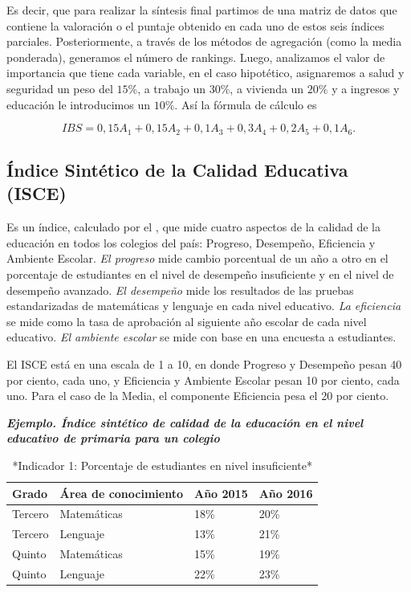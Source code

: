 \documentclass[
]{book}
\begin{document}
Es decir, que para realizar la síntesis final partimos de una matriz de datos que contiene la valoración o el puntaje obtenido en cada uno de estos seis índices parciales. Posteriormente, a través de los métodos de agregación (como la media ponderada), generamos el número de rankings. Luego, analizamos el valor de importancia que tiene cada variable, en el caso hipotético, asignaremos a salud y seguridad un peso del \(15\%\), a trabajo un \(30\%\), a vivienda un \(20\%\) y a ingresos y educación le introducimos un \(10\%\). Así la fórmula de cálculo es

\[\begin{equation}
IBS=0,15A_1+0,15A_2+0,1A_3+0,3A_4+0,2A_5+0,1A_6.
\end{equation}\]

\hypertarget{uxedndice-sintuxe9tico-de-la-calidad-educativa-isce}{%
\subsection{Índice Sintético de la Calidad Educativa (ISCE)}\label{uxedndice-sintuxe9tico-de-la-calidad-educativa-isce}}

Es un índice, calculado por el \citet{BibEntry2021Mayo}, que mide cuatro
aspectos de la calidad de la educación en todos los colegios
del país: Progreso, Desempeño, Eficiencia y Ambiente Escolar. \emph{El progreso} mide cambio porcentual de un año a otro en el porcentaje de estudiantes en el nivel de desempeño insuficiente y en el nivel de desempeño avanzado. \emph{El desempeño} mide los resultados de las pruebas estandarizadas de matemáticas y lenguaje en cada nivel educativo. \emph{La eficiencia} se mide como la tasa
de aprobación al siguiente año escolar de cada nivel educativo. \emph{El ambiente escolar} se mide con base en una encuesta a estudiantes.

El ISCE está en una escala de 1 a 10, en donde Progreso y Desempeño pesan 40 por ciento, cada uno, y Eficiencia y Ambiente Escolar pesan 10 por ciento, cada uno. Para el caso de la Media, el componente Eficiencia pesa el 20 por ciento.

\textbf{\emph{Ejemplo. Índice sintético de calidad de la educación en el nivel educativo de primaria para un colegio}}

\begin{table}

\caption{\label{tab:unnamed-chunk-9}*Indicador 1: Porcentaje de estudiantes en nivel insuficiente*}
\centering
\begin{tabular}[t]{l|l|l|l}
\hline
Grado & Área de conocimiento & Año 2015 & Año 2016\\
\hline
Tercero & Matemáticas & 18\% & 20\%\\
\hline
Tercero & Lenguaje & 13\% & 21\%\\
\hline
Quinto & Matemáticas & 15\% & 19\%\\
\hline
Quinto & Lenguaje & 22\% & 23\%\\
\hline
\end{tabular}
\end{table}
\end{document}
